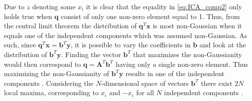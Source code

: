 Due to $z$ denoting some $x_i$ it is clear that the equality in \eqref{eq:ICA_comp2} only holds true when $\mathbf{q}$ consist of only one non-zero element equal to 1.  
Thus, from the central limit theorem the distribution of $\mathbf{q}^T \mathbf{x}$ is most non-Gaussian when it equals one of the independent components which was assumed non-Gaussian. 
As such, since $\mathbf{q}^T \mathbf{x} = \mathbf{b}^{T} \mathbf{y}$, it is possible to vary the coefficients in $\mathbf{b}$ and look at the distribution of $\mathbf{b}^{T} \mathbf{y}$. 
Finding the vector $\mathbf{b}^T$ that maximizes the non-Gaussianity would then correspond to $\mathbf{q} = \mathbf{A}^T \mathbf{b}^T$ having only a single non-zero element. 
Thus maximizing the non-Gaussianity of $\mathbf{b}^{T} \mathbf{y}$ results in one of the independent components \cite[p. 166]{ICA}. 
Considering the $N$-dimensional space of vectors $\mathbf{b}^T$ there exist $2N$ local maxima, corresponding to $x_i$ and $-x_i$ for all $N$ independent components \cite[p. 166]{ICA}. 


